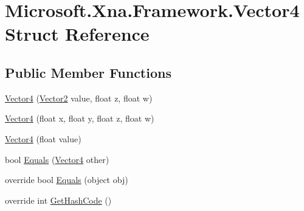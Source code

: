 \hypertarget{struct_microsoft_1_1_xna_1_1_framework_1_1_vector4}{}\section{Microsoft.\+Xna.\+Framework.\+Vector4 Struct Reference}
\label{struct_microsoft_1_1_xna_1_1_framework_1_1_vector4}
\subsection*{Public Member Functions}
\begin{DoxyCompactItemize}
\item 
\hyperlink{struct_microsoft_1_1_xna_1_1_framework_1_1_vector4_a35540a1266ea2d69fd329c864ec90854}{Vector4} (\hyperlink{struct_microsoft_1_1_xna_1_1_framework_1_1_vector2}{Vector2} value, float z, float w)
\item 
\hyperlink{struct_microsoft_1_1_xna_1_1_framework_1_1_vector4_aee0b6f2e266b282ca6c6d1e59c9f6b82}{Vector4} (float x, float y, float z, float w)
\item 
\hyperlink{struct_microsoft_1_1_xna_1_1_framework_1_1_vector4_a0fd3cd0c8206952d373fc03fb668703b}{Vector4} (float value)
\item 
bool \hyperlink{struct_microsoft_1_1_xna_1_1_framework_1_1_vector4_a7cd4d2a454c7458967cedf5b57ec1074}{Equals} (\hyperlink{struct_microsoft_1_1_xna_1_1_framework_1_1_vector4}{Vector4} other)
\item 
override bool \hyperlink{struct_microsoft_1_1_xna_1_1_framework_1_1_vector4_a06d4feb103f8a28aa7048a2699237784}{Equals} (object obj)
\item 
override int \hyperlink{struct_microsoft_1_1_xna_1_1_framework_1_1_vector4_a351072be037f7cd6dff4c917940f059e}{Get\+Hash\+Code} ()
\end{DoxyCompactItemize}
